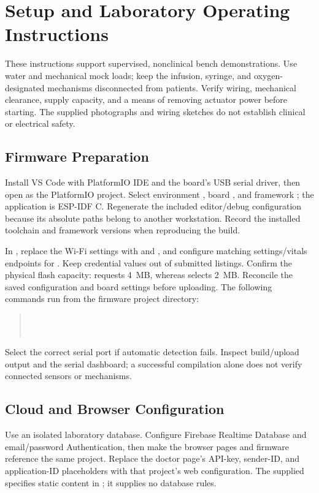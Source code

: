 \appendices
\section{Setup and Laboratory Operating Instructions}
\label{app:operating-instructions}

These instructions support supervised, nonclinical bench demonstrations. Use water and mechanical mock loads; keep the infusion, syringe, and oxygen-designated mechanisms disconnected from patients. Verify wiring, mechanical clearance, supply capacity, and a means of removing actuator power before starting. The supplied photographs and wiring sketches do not establish clinical or electrical safety.

\subsection{Firmware Preparation}
Install VS Code with PlatformIO IDE and the board's USB serial driver, then open  as the PlatformIO project. Select environment , board , and framework ; the application is ESP-IDF C. Regenerate the included editor/debug configuration because its absolute paths belong to another workstation. Record the installed toolchain and framework versions when reproducing the build.

In , replace the Wi-Fi settings with  and , and configure matching settings/vitals endpoints for . Keep credential values out of submitted listings. Confirm the physical flash capacity:  requests 4~MB, whereas  selects 2~MB. Reconcile the saved configuration and board settings before uploading. The following commands run from the firmware project directory:
\begin{quote}
\small
{}\\
\\
\end{quote}
Select the correct serial port if automatic detection fails. Inspect build/upload output and the serial dashboard; a successful compilation alone does not verify connected sensors or mechanisms.

\subsection{Cloud and Browser Configuration}
Use an isolated laboratory database. Configure Firebase Realtime Database and email/password Authentication, then make the browser pages and firmware reference the same project. Replace the doctor page's API-key, sender-ID, and application-ID placeholders with that project's web configuration. The supplied  specifies static content in ; it supplies no database rules.

